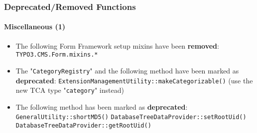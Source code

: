 %

\begin{frame}[fragile]
	\frametitle{Deprecated/Removed Functions}
	\framesubtitle{Miscellaneous (1)}


	\begin{itemize}
		\item The following Form Framework setup mixins have been \textbf{removed}:\newline
			\small\texttt{TYPO3.CMS.Form.mixins.*}\normalsize
		\item The "\texttt{CategoryRegistry}" and the following method have been
			marked as \textbf{deprecated}:\newline
			\texttt{ExtensionManagementUtility::makeCategorizable()}\newline
			\small(use the new TCA type "\texttt{category}" instead)\normalsize
		\item The following method has been marked as \textbf{deprecated}:\newline
			\small
				\texttt{GeneralUtility::shortMD5()}\newline
				\texttt{DatabaseTreeDataProvider::setRootUid()}\newline
				\texttt{DatabaseTreeDataProvider::getRootUid()}
			\normalsize
	\end{itemize}

\end{frame}

